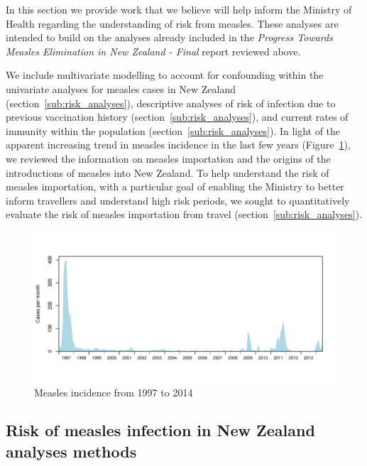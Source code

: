\documentclass{article}
\begin{document}
\begin{itemize}
In this section we provide work that we believe will help inform the Ministry of Health regarding the understanding of risk from measles. These analyses are intended to build on the analyses already included in the \emph {Progress Towards Measles Elimination in New Zealand - Final} report reviewed above.

We include multivariate modelling to account for confounding within the univariate analyses for measles cases in New Zealand (section~\ref{sub:risk_analyses}), descriptive analyses of risk of infection due to previous vaccination history (section~\ref{sub:risk_analyses}), and current rates of immunity within the population (section~\ref{sub:risk_analyses}). In light of the apparent increasing trend in measles incidence in the last few years (Figure~\ref{fig:incidence1997}), we reviewed the information on measles importation and the origins of the introductions of measles into New Zealand. To help understand the risk of measles importation, with a particular goal of enabling the Ministry to better inform travellers and understand high risk periods, we sought to quantitatively evaluate the risk of measles importation from travel (section~\ref{sub:risk_analyses}).

\begin{figure}
     \centering
     \includegraphics[width=1\textwidth]{incidence_1997_2014.pdf}
     \caption{Measles incidence from 1997 to 2014}
     \label{fig:incidence1997}
\end{figure}

\subsection{Risk of measles infection in New Zealand analyses methods}


\end{itemize}
\end{document}

